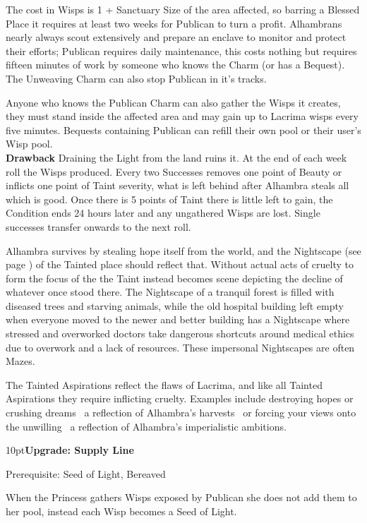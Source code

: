 The cost in Wisps is 1 + Sanctuary Size of the area affected, so barring a Blessed Place it requires at least two weeks for Publican to turn a profit. Alhambrans nearly always scout extensively and prepare an enclave to monitor and protect their efforts; Publican requires daily maintenance, this costs nothing but requires fifteen minutes of work by someone who knows the Charm (or has a Bequest). The Unweaving Charm can also stop Publican in it's tracks. 

Anyone who knows the Publican Charm can also gather the Wisps it creates, they must stand inside the affected area and may gain up to Lacrima wisps every five minutes. Bequests containing Publican can refill their own pool or their user's Wisp pool. \\

\noindent \textbf{Drawback} Draining the Light from the land ruins it. At the end of each week roll the Wisps produced. Every two Successes removes one point of Beauty or inflicts one point of Taint severity, what is left behind after Alhambra steals all which is good. Once there is 5 points of Taint there is little left to gain, the Condition ends 24 hours later and any ungathered Wisps are lost. Single successes transfer onwards to the next roll.

Alhambra survives by stealing hope itself from the world, and the Nightscape (see page \pageref{TaintedPlaceRef}) of the Tainted place should reflect that. Without actual acts of cruelty to form the focus of the the Taint instead becomes scene depicting the decline of whatever once stood there. The Nightscape of a tranquil forest is filled with diseased trees and starving animals, while the old hospital building left empty when everyone moved to the newer and better building has a Nightscape where stressed and overworked doctors take dangerous shortcuts around medical ethics due to overwork and a lack of resources. These impersonal Nightscapes are often Mazes. 

The Tainted Aspirations reflect the flaws of Lacrima, and like all Tainted Aspirations they require inflicting cruelty. Examples include destroying hopes or crushing dreams \textemdash\, a reflection of Alhambra's harvests \textemdash\, or forcing your views onto the unwilling \textemdash\, a reflection of Alhambra's imperialistic ambitions. 

\begin{myindentpar}{10pt}\textbf{Upgrade: Supply Line}

Prerequisite: Seed of Light, Bereaved 

When the Princess gathers Wisps exposed by Publican she does not add them to her pool, instead each Wisp becomes a Seed of Light.\end{myindentpar}

